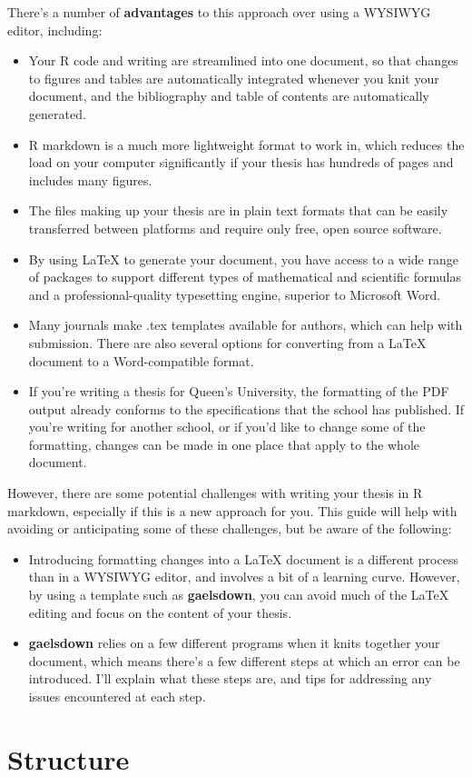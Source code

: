 \documentclass[12pt, oneside]{queensuthesis}
\numberwithin{equation}{chapter}       %
\providecommand{\tightlist}{%
  \setlength{\itemsep}{0pt}\setlength{\parskip}{0pt}}
\begin{document}
There's a number of \textbf{advantages} to this approach over using a WYSIWYG editor, including:
\begin{itemize}
\tightlist
\item
  Your R code and writing are streamlined into one document, so that changes to figures and tables are automatically integrated whenever you knit your document, and the bibliography and table of contents are automatically generated.
\item
  R markdown is a much more lightweight format to work in, which reduces the load on your computer significantly if your thesis has hundreds of pages and includes many figures.
\item
  The files making up your thesis are in plain text formats that can be easily transferred between platforms and require only free, open source software.
\item
  By using LaTeX to generate your document, you have access to a wide range of packages to support different types of mathematical and scientific formulas and a professional-quality typesetting engine, superior to Microsoft Word.
\item
  Many journals make .tex templates available for authors, which can help with submission. There are also several options for converting from a LaTeX document to a Word-compatible format.
\item
  If you're writing a thesis for Queen's University, the formatting of the PDF output already conforms to the specifications that the school has published. If you're writing for another school, or if you'd like to change some of the formatting, changes can be made in one place that apply to the whole document.
\end{itemize}
However, there are some potential challenges with writing your thesis in R markdown, especially if this is a new approach for you. This guide will help with avoiding or anticipating some of these challenges, but be aware of the following:
\begin{itemize}
\tightlist
\item
  Introducing formatting changes into a LaTeX document is a different process than in a WYSIWYG editor, and involves a bit of a learning curve. However, by using a template such as \textbf{gaelsdown}, you can avoid much of the LaTeX editing and focus on the content of your thesis.
\item
  \textbf{gaelsdown} relies on a few different programs when it knits together your document, which means there's a few different steps at which an error can be introduced. I'll explain what these steps are, and tips for addressing any issues encountered at each step.
\end{itemize}
\hypertarget{structure}{%
\section*{Structure}\label{structure}}
\end{document}
